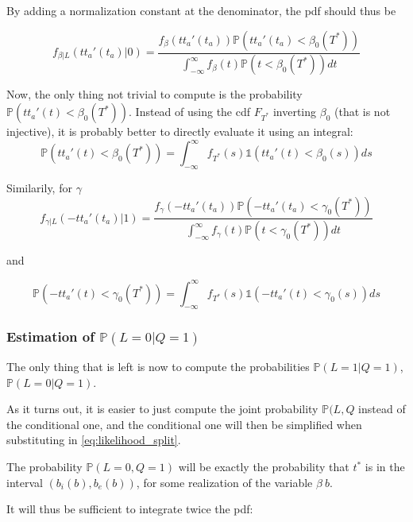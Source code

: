 \documentclass{article}
\begin{document}
By adding a normalization constant at the denominator, the pdf should thus be

\begin{equation*}
  f_{\beta | L}(tt_a'(t_a) | 0) = \frac{f_\beta(tt_a'(t_a))\mathbb{P}(tt_a'(t_a) < \beta_0(T^*))}{\int_{-\infty}^\infty f_\beta(t)\mathbb{P}(t < \beta_0(T^*)) dt}
\end{equation*}

Now, the only thing not trivial to compute is the probability \(\mathbb{P}(tt_a'(t) < \beta_0(T^*))\).
Instead of using the cdf \(F_{T^*}\) inverting \(\beta_0\) (that is not injective), it is probably better to directly evaluate it using an integral:
\begin{equation*}
  \mathbb{P}(tt_a'(t) < \beta_0(T^*)) = \int_{-\infty}^\infty f_{T^*}(s) \mathbb{1}(tt_a'(t) < \beta_0(s)) ds
\end{equation*}

Similarily, for \(\gamma\)
\begin{equation*}
  f_{\gamma | L}(-tt_a'(t_a) | 1) = \frac{f_\gamma(-tt_a'(t_a))\mathbb{P}(-tt_a'(t_a) < \gamma_0(T^*))}{\int_{-\infty}^\infty f_\gamma(t)\mathbb{P}(t < \gamma_0(T^*)) dt}
\end{equation*}

and

\begin{equation*}
  \mathbb{P}(-tt_a'(t) < \gamma_0(T^*)) = \int_{-\infty}^\infty f_{T^*}(s) \mathbb{1}(-tt_a'(t) < \gamma_0(s)) ds
\end{equation*}

\subsubsection{Estimation of $\mathbb{P}(L=0 | Q=1)$}

The only thing that is left is now to compute the probabilities \(\mathbb{P}(L=1 | Q=1)\), \(\mathbb{P}(L=0 | Q=1)\).

As it turns out, it is easier to just compute the joint probability \(\mathbb{P}(L, Q\) instead of the conditional one, and the conditional one will then be simplified when substituting in \eqref{eq:likelihood_split}.

The probability \(\mathbb{P}(L=0, Q=1)\) will be exactly the probability that \(t^*\) is in the interval \((b_i(b), b_e(b))\), for some realization of the variable \(\beta\ b\).

It will thus be sufficient to integrate twice the pdf:
\end{document}
